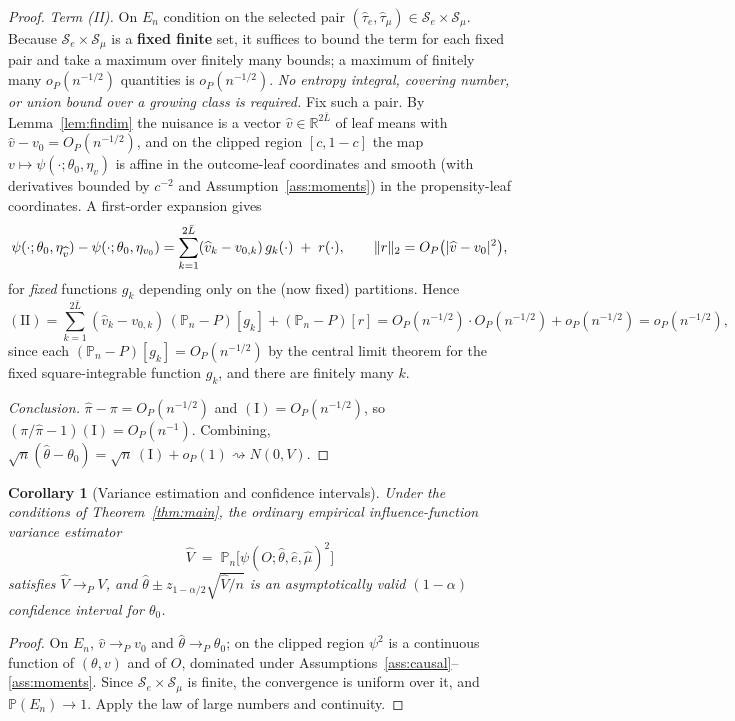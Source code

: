 \documentclass[11pt]{article}
\theoremstyle{plain}
\newtheorem{corollary}{Corollary}
\theoremstyle{definition}
\theoremstyle{remark}
\newcommand{\PP}{\mathbb{P}}
\newcommand{\Pn}{\mathbb{P}_n}
\newcommand{\R}{\mathbb{R}}
\newcommand{\cS}{\mathcal{S}}
\newcommand{\ehat}{\widehat{e}}
\newcommand{\mhat}{\widehat{\mu}}
\newcommand{\that}{\widehat{\tau}}
\newcommand{\thetahat}{\widehat{\theta}}
\newcommand{\Ltwo}[1]{\lVert #1 \rVert_{2}}
\DeclarePairedDelimiter{\abs}{\lvert}{\rvert}
\begin{document}
\begin{proof}
\emph{Term (II).} On $E_n$ condition on the selected pair
$(\that_e,\that_\mu)\in\cS_e\times\cS_\mu$. Because $\cS_e\times\cS_\mu$ is a
\textbf{fixed finite} set, it suffices to bound the term for each fixed pair and
take a maximum over finitely many bounds; a maximum of finitely many $o_P(n^{-1/2})$
quantities is $o_P(n^{-1/2})$. \emph{No entropy integral, covering number, or
union bound over a growing class is required.} Fix such a pair. By
Lemma~\ref{lem:findim} the nuisance is a vector
$\widehat v\in\R^{2\bar L}$ of leaf means with
$\widehat v - v_0 = O_P(n^{-1/2})$, and on the clipped region $[c,1-c]$ the map
$v\mapsto\psi(\cdot;\theta_0,\eta_v)$ is affine in the outcome-leaf coordinates
and smooth (with derivatives bounded by $c^{-2}$ and Assumption~\ref{ass:moments})
in the propensity-leaf coordinates. A first-order expansion gives
\[
  \psi(\cdot;\theta_0,\eta_{\widehat v})-\psi(\cdot;\theta_0,\eta_{v_0})
  = \sum_{k=1}^{2\bar L} (\widehat v_k - v_{0,k})\, g_k(\cdot) \;+\; r(\cdot),
  \qquad \Ltwo{r} = O_P\bigl(\abs{\widehat v - v_0}^2\bigr),
\]
for \emph{fixed} functions $g_k$ depending only on the (now fixed) partitions.
Hence
\[
  \mathrm{(II)}
  = \sum_{k=1}^{2\bar L} (\widehat v_k - v_{0,k})\,(\Pn-P)[g_k]
    + (\Pn-P)[r]
  = O_P(n^{-1/2})\cdot O_P(n^{-1/2}) + o_P(n^{-1/2})
  = o_P(n^{-1/2}),
\]
since each $(\Pn-P)[g_k]=O_P(n^{-1/2})$ by the central limit theorem for the
fixed square-integrable function $g_k$, and there are finitely many $k$.

\emph{Conclusion.} $\widehat\pi-\pi=O_P(n^{-1/2})$ and
$\mathrm{(I)}=O_P(n^{-1/2})$, so $(\pi/\widehat\pi-1)\mathrm{(I)}=O_P(n^{-1})$.
Combining, $\sqrt n(\thetahat-\theta_0)=\sqrt n\,\mathrm{(I)}+o_P(1)
\rightsquigarrow N(0,V)$.
\end{proof}

\begin{corollary}[Variance estimation and confidence intervals]\label{cor:variance}
Under the conditions of Theorem~\ref{thm:main}, the ordinary empirical
influence-function variance estimator
\[
  \widehat V \;=\; \Pn\bigl[\psi(O;\thetahat,\ehat,\mhat)^2\bigr]
\]
satisfies $\widehat V\to_P V$, and
$\thetahat\pm z_{1-\alpha/2}\sqrt{\widehat V/n}$ is an asymptotically valid
$(1-\alpha)$ confidence interval for $\theta_0$.
\end{corollary}

\begin{proof}
On $E_n$, $\widehat v\to_P v_0$ and $\thetahat\to_P\theta_0$; on the clipped
region $\psi^2$ is a continuous function of $(\theta,v)$ and of $O$, dominated
under Assumptions~\ref{ass:causal}--\ref{ass:moments}. Since
$\cS_e\times\cS_\mu$ is finite, the convergence is uniform over it, and
$\PP(E_n)\to1$. Apply the law of large numbers and continuity.
\end{proof}
\end{document}
